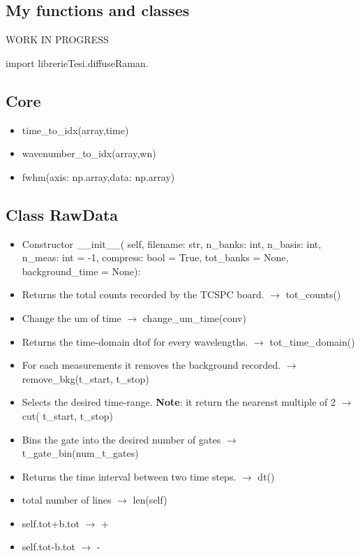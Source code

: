 \documentclass{article}
\begin{document}
\begin{multicols}{2}
\section{My functions and classes}
WORK IN PROGRESS

import librerieTesi.diffuseRaman.

\subsection{Core}

\begin{itemize}
\item time\_to\_idx(array,time)
\item wavenumber\_to\_idx(array,wn)
\item fwhm(axis: np.array,data: np.array)
\end{itemize}
\subsection{Class RawData}
\begin{itemize}
\item Constructor \_\_init\_\_(
            self,
            filename: str,
            n\_banks: int,
            n\_basis: int,
            n\_meas: int = -1,
            compress: bool = True,
            tot\_banks = None,
            background\_time = None):
\item Returns the total counts recorded by the TCSPC board. $\rightarrow$ tot\_counts()  
\item Change the um of time $\rightarrow$ change\_um\_time(conv)
\item  Returns the time-domain dtof for every wavelengths. $\rightarrow$ tot\_time\_domain()
\item  For each measurements it removes the background recorded. $\rightarrow$ remove\_bkg(t\_start, t\_stop)
\item Selects the desired time-range. \textbf{Note}: it return the nearenst multiple of 2 $\rightarrow$ cut( t\_start, t\_stop)
\item Bins the gate into the desired number of gates $\rightarrow$ t\_gate\_bin(num\_t\_gates)
\item Returns the time interval between two time steps. $\rightarrow$ dt()
\item total number of lines $\rightarrow$ len(self)
\item self.tot+b.tot $\rightarrow$ +
\item self.tot-b.tot $\rightarrow$ -
\end{itemize}

\end{multicols}
\end{document}
